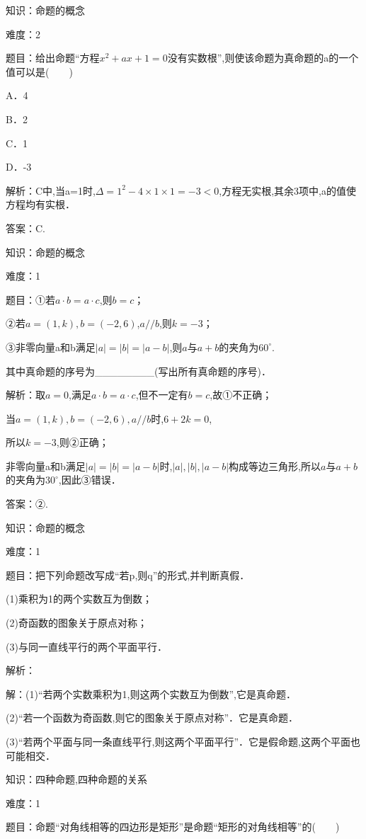\documentclass{article} %
\begin{document}
知识：命题的概念

难度：2

题目：给出命题``方程$x^2+ax+1=0$没有实数根'',则使该命题为真命题的a的一个值可以是(　　)

A．4　　　　

B．2　　　　

C．1　　　　

D．-3

解析：C中,当a=1时,$\Delta =1^2-4\times 1\times 1=-3<0$,方程无实根,其余3项中,a的值使方程均有实根．

答案：C.



知识：命题的概念

难度：1

题目：①若$a\cdot b=a\cdot c$,则$b=c$；

②若$a=(1,k),b=(-2,6)$,$a//b$,则$k=-3$；

③非零向量a和b满足$|a|=|b|=|a-b|$,则$a$与$a+b$的夹角为$60^{\circ}$.

其中真命题的序号为\_\_\_\_\_\_\_\_(写出所有真命题的序号)．

解析：取$a=0$,满足$a\cdot b=a\cdot c$,但不一定有$b=c$,故①不正确；

当$a=(1,k),b=(-2,6),a//b$时,$6+2k=0$,

所以$k=-3$,则②正确；

非零向量a和b满足$|a|=|b|=|a-b|$时,$|a|,|b|,|a-b|$构成等边三角形,所以$a$与$a+b$的夹角为$30^{\circ}$,因此③错误．

答案：②.



知识：命题的概念

难度：1

题目：把下列命题改写成``若p,则q''的形式,并判断真假．

(1)乘积为1的两个实数互为倒数；

(2)奇函数的图象关于原点对称；

(3)与同一直线平行的两个平面平行．

解析：

解：(1)``若两个实数乘积为1,则这两个实数互为倒数'',它是真命题．

(2)``若一个函数为奇函数,则它的图象关于原点对称''．它是真命题．

(3)``若两个平面与同一条直线平行,则这两个平面平行''．它是假命题,这两个平面也可能相交．

知识：四种命题,四种命题的关系

难度：1

题目：命题``对角线相等的四边形是矩形''是命题``矩形的对角线相等''的(　　)
\end{document}
